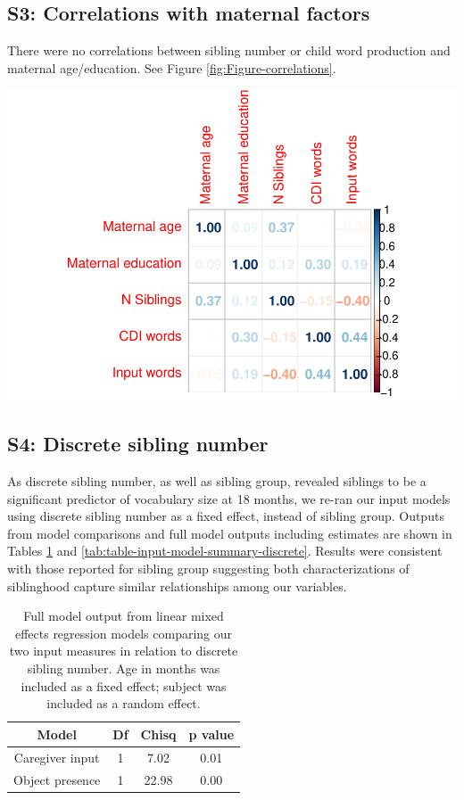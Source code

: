 \documentclass[
  english,
  man,floatsintext]{apa6}
\begin{document}
\newpage

\hypertarget{s3-correlations-with-maternal-factors}{%
\subsection{S3: Correlations with maternal factors}\label{s3-correlations-with-maternal-factors}}

There were no correlations between sibling number or child word production and maternal age/education. See Figure \ref{fig:Figure-correlations}.

\includegraphics{SiblingsStudy_SupplementaryData_files/figure-latex/Figure-correlations-1.pdf}
\newpage

\hypertarget{s4-discrete-sibling-number}{%
\subsection{S4: Discrete sibling number}\label{s4-discrete-sibling-number}}

As discrete sibling number, as well as sibling group, revealed siblings to be a significant predictor of vocabulary size at 18 months, we re-ran our input models using discrete sibling number as a fixed effect, instead of sibling group. Outputs from model comparisons and full model outputs including estimates are shown in Tables \ref{tab:table-model-comparisons-discrete} and \ref{tab:table-input-model-summary-discrete}. Results were consistent with those reported for sibling group suggesting both characterizations of siblinghood capture similar relationships among our variables.

\begin{longtable}[t]{cccc}
\caption{\label{tab:table-model-comparisons-discrete}Full model output from linear mixed effects regression models comparing our two input measures in relation to discrete sibling number. Age in months was included as a fixed effect; subject was included as a random effect.}\\
\toprule
Model & Df & Chisq & p value\\
\midrule
Caregiver input & 1 & 7.02 & 0.01\\
Object presence & 1 & 22.98 & 0.00\\
\bottomrule
\end{longtable}
\end{document}
